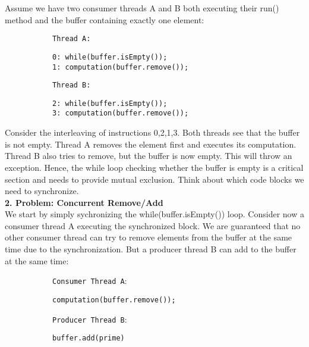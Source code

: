 \documentclass[main.tex]{subfiles}
\begin{document}
Assume we have two consumer threads A and B both executing their run() method and the buffer containing exactly one element:
    \begin{figure}[H]
        \begin{subfigure}{.52\textwidth}
            \texttt{Thread A:}
            \begin{verbatim}
0: while(buffer.isEmpty());
1: computation(buffer.remove());
            \end{verbatim}
        \end{subfigure}%
        \begin{subfigure}{.52\textwidth}
            \texttt{Thread B:}
            \begin{verbatim}
2: while(buffer.isEmpty());
3: computation(buffer.remove());
            \end{verbatim}
        \end{subfigure}
    \end{figure}
Consider the interleaving of instructions 0,2,1,3. Both threads see that the buffer is not empty. Thread A removes the element first and executes its computation. Thread B also tries to remove, but the buffer is now empty. This will throw an exception. Hence, the while loop checking whether the buffer is empty is a critical section and needs to provide mutual exclusion. Think about which code blocks we need to synchronize.\\[3mm]
\textbf{2. Problem: Concurrent Remove/Add}\\
We start by simply sychronizing the while(buffer.isEmpty()) loop. Consider now a consumer thread A executing the synchronized block. We are guaranteed that no other consumer thread can try to remove elements from the buffer at the same time due to the synchronization. But a producer thread B can add to the buffer at the same time:
\begin{figure}[H]
    \begin{subfigure}{.52\textwidth}
        \texttt{Consumer Thread A}:
        \begin{verbatim}
computation(buffer.remove());
        \end{verbatim}
    \end{subfigure}%
    \begin{subfigure}{.52\textwidth}
        \texttt{Producer Thread B}:
        \begin{verbatim}
buffer.add(prime)
        \end{verbatim}
    \end{subfigure}
\end{figure}
\end{document}
